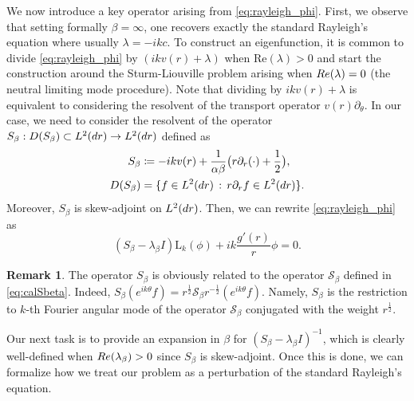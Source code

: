 \documentclass[11pt,reqno]{amsproc}
\def\dd{{\rm d}}
\def\de{{\partial}}
\def\Re{{\rm Re}}
\newcommand{\rmL}{\mathrm{L}}
\theoremstyle{definition}
\newtheorem{remark}[proposition]{Remark}
\theoremstyle{definition}
\numberwithin{equation}{section}
\begin{document}
We now introduce a key  operator arising from \cref{eq:rayleigh_phi}. First, we observe that  setting formally $\beta=\infty$, one recovers exactly the standard Rayleigh's equation where usually $\lambda=-ikc$. To construct an eigenfunction, it is  common to divide \cref{eq:rayleigh_phi} by $(ik v(r)+\lambda)$ when $\mathrm{Re}(\lambda)>0$ and start the construction around the Sturm-Liouville problem arising when $\Re(\lambda) =0$ (the neutral limiting mode procedure). Note that dividing by $ik v(r)+\lambda$ is equivalent to considering the resolvent of the transport operator $v(r)\de_{\theta}$. In our case, we need to consider the resolvent of the operator $S_\beta: D(S_\beta)\subset L^2(\dd r)\to L^2(\dd r)$ defined as
\begin{align}
    \label{def:Sbeta}S_\beta&\coloneqq-ikv(r) + \frac{1}{\alpha\beta} \big(r\partial_r(\cdot) + \frac{1}{2}\big),\\
    D(S_\beta)& =\{f\in L^2(\dd r) \, : \, r\de_r f \in L^2(\dd r) \}.
\end{align}
Moreover, $S_\beta$ is skew-adjoint on $L^2(\dd r)$. Then, we can rewrite \cref{eq:rayleigh_phi} as
\begin{equation}
\label{eq:rayleigh_phi_Sbeta}
\left(S_\beta -\lambda_\beta I\right)\rmL_k(\phi)+ik\frac{g'(r)}{r}\phi=0.
\end{equation}

\begin{remark}
\label{rem:Sbeta}
    The operator $S_\beta$ is obviously related to the operator $\mathcal{S}_\beta$ defined in \cref{eq:calSbeta}. Indeed, $S_\beta(e^{ik\theta} f)=r^\frac12\mathcal{S}_\beta r^{-\frac12}(e^{ik\theta} f)$. Namely, $S_\beta$ is the restriction to $k$-th Fourier angular mode of the operator $\mathcal{S}_\beta$ conjugated with the weight $r^\frac12$.
\end{remark}

Our next task is to provide an expansion in $\beta$ for $(S_\beta-\lambda_\beta I)^{-1}$, which is clearly well-defined when $\Re(\lambda_\beta)>0$ since $S_\beta$ is skew-adjoint. 
Once this is done, we can formalize how we treat our problem as a perturbation of the standard Rayleigh's equation. 
\end{document}
